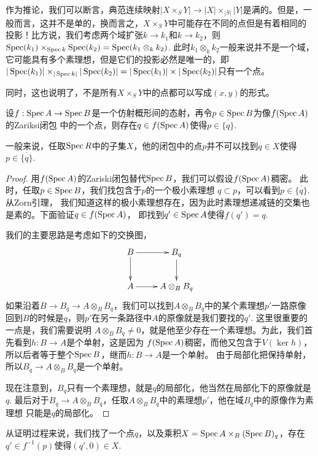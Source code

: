 作为推论，我们可以断言，典范连续映射$|X\times_S Y|\to |X|\times_{|S|}|Y|$是满的。但是，一般而言，这并不是单的，换而言之，$X\times_S Y$中可能存在不同的点但是有着相同的投影！比方说，我们考虑两个域扩张$k\to k_1$和$k\to k_2$，则$\operatorname{Spec}(k_1)\times_{\operatorname{Spec} k} \operatorname{Spec}(k_2)=\operatorname{Spec}(k_1\otimes_k k_2)$. 此时$k_1\otimes_k k_2$一般来说并不是一个域，它可能具有多个素理想，但是它们的投影必然是唯一的，即$|\operatorname{Spec}(k_1)|\times_{|\operatorname{Spec} k|} |\operatorname{Spec}(k_2)|=|\operatorname{Spec}(k_1)|\times |\operatorname{Spec}(k_2)|$只有一个点。

同时，这也说明了，不是所有$X\times_S Y$中的点都可以写成$(x,y)$的形式。

\begin{pro}
	设$f:\operatorname{Spec} A\to \operatorname{Spec} B$是一个仿射概形间的态射，再令$p\in \operatorname{Spec} B$为像$f(\operatorname{Spec} A)$的Zariksi闭包
	中的一个点，则存在$q\in f(\operatorname{Spec} A)$使得$p\in \overline{\{q\}}$.
\end{pro}

一般来说，任取$\operatorname{Spec} R$中的子集$X$，他的闭包中的点$p$并不可以找到$q\in X$使得$p\in \overline{\{q\}}$.

\begin{proof}
用$f(\operatorname{Spec} A)$的Zariski闭包替代$\operatorname{Spec} B$，我们可以假设$f(\operatorname{Spec} A)$稠密。
此时，任取$p\in \operatorname{Spec} B$，我们找包含于$p$的一个极小素理想
$q\subset p$，可以看到$p\in \overline{\{q\}}$. 从Zorn引理，
我们知道这样的极小素理想存在，因为此时素理想递减链的交集也是素的。下面验证$q\in f(\operatorname{Spec} A)$，
即找到$q'\in \operatorname{Spec} A$使得$f(q')=q$.

我们的主要思路是考虑如下的交换图，
\[
\xymatrix{
	B\ar[r]\ar[d]& B_q\ar[d]\\
	A\ar[r]&A\otimes_B B_{q}
}
\]
如果沿着$B\to B_q\to A\otimes_B B_{q}$，我们可以找到$A\otimes_B B_{q}$中的某个素理想$p'$一路原像
回到$B$的时候是$q$，则$p'$在另一条路径中$A$的原像就是我们要找的$q'$. 这里很重要的一点是，我们需要说明
$A\otimes_B B_{q}\neq 0$，就是他至少存在一个素理想。为此，我们首先看到$h:B\to A$是个单射，这是因为
$f(\operatorname{Spec} A)$稠密，而他又包含于$V(\ker h)$，所以后者等于整个$\operatorname{Spec} B$，继而$h:B\to A$是一个单射。
由于局部化把保持单射，所以$B_q\to A\otimes_B B_{q}$是一个单射。

现在注意到，$B_q$只有一个素理想，就是$q$的局部化，他当然在局部化下的原像就是$q$.
最后对于$B_{q}\to A\otimes_B B_q$，任取$A\otimes_B B_q$中的素理想$p'$，他在域$B_q$中的原像作为素理想
只能是$q$的局部化。
\end{proof}

从证明过程来说，我们找了一个点$q$，以及乘积$X=\operatorname{Spec} A\times_{B}(\operatorname{Spec} B)_q$，存在$q'\in f^{-1}(p)$使得$(q',0)\in X$.

